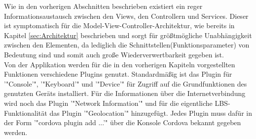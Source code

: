 Wie in den vorherigen Abschnitten beschrieben existiert ein reger Informationsaustausch zwischen den Views, den Controllern und Services. Dieser ist symptomatisch für die Model-View-Controller-Architektur, wie bereits in Kapitel \ref{sec:Architektur} beschrieben und sorgt für größtmögliche Unabhängigkeit zwischen den Elementen, da lediglich die Schnittstellen(Funktionsparameter) von Bedeutung sind und somit auch große Wiederverwertbarkeit gegeben ist.
\\
Von der Applikation werden für die in den vorherigen Kapiteln vorgestellten Funktionen verschiedene Plugins genutzt.
Standardmäßig ist das Plugin für '"Console'", '"Keyboard'" und '"Device'" für Zugriff auf die Grundfunktionen des genutzten Geräts installiert. Für die Informationen über die Internetverbindung wird noch das Plugin '"Network Information'" und für die eigentliche LBS-Funktionalität das Plugin '"Geolocation'" hinzugefügt. Jedes Plugin muss dafür in der Form '"cordova plugin add ...'" über die Konsole Cordova bekannt gegeben werden.

\newpage
